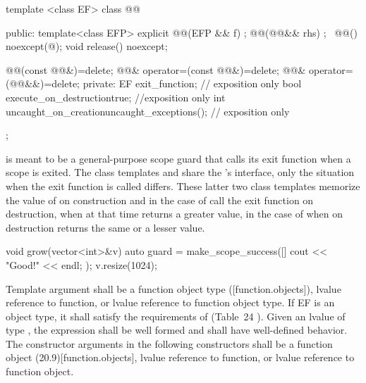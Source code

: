 \documentclass[ebook,11pt,article]{memoir}
\begin{document}
\begin{codeblock}
template <class EF>
class @@ {
public:
  template<class EFP>
  explicit @@(EFP && f) ;
  @@(@@&& rhs) ;
  ~@@() noexcept(@\seebelow@);
  void release() noexcept;

  @@(const @@&)=delete;
  @@& operator=(const @@&)=delete;
  @@& operator=(@@&&)=delete;
private:
  EF exit_function;    // exposition only
  bool execute_on_destruction{true}; //exposition only
  int  uncaught_on_creation{uncaught_exceptions()}; // exposition only
};

\end{codeblock}
\pnum
\enternote
{} is meant to be a general-purpose scope guard that calls its exit function when a scope is exited. The class templates  and  share the 's interface, only the situation when the exit function is called differs. These latter two class templates memorize the value of  on construction and in the case of  call the exit function on destruction, when  at that time returns a greater value, in the case of  when  on destruction returns the same or a lesser value.\\
\enterexample
\begin{codeblock}
void grow(vector<int>&v){
	auto guard = make_scope_success([]{ cout << "Good!" << endl; });
	v.resize(1024);
}
\end{codeblock}
\exitexample
\exitnote


\pnum
\requires
Template argument  shall be a function object type ([function.objects]), 
lvalue reference to function, or 
lvalue reference to function object type.
If EF is an object type, it  shall satisfy
the requirements of  (Table~24
). 
Given an lvalue  of type , the expression  shall be well formed and shall have well-defined behavior.
The constructor arguments  in the following constructors shall be a function object (20.9)[function.objects], 
lvalue reference to function, or 
lvalue reference to function object.
\end{document}
